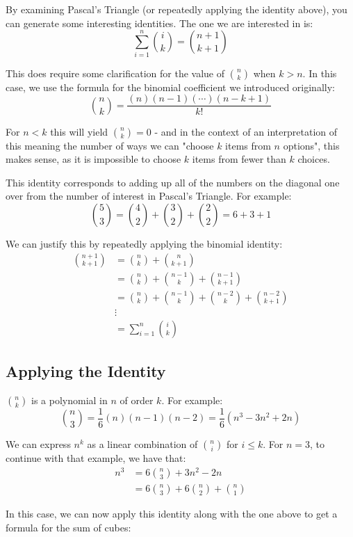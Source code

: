 \documentclass{article}
\begin{document}
By examining Pascal's Triangle (or repeatedly applying the identity above), you can generate
some interesting identities. The one we are interested in is:
\[ \sum_{i=1}^{n} \binom{i}{k} = \binom{n+1}{k+1} \]

This does require some clarification for the value of $\binom{n}{k}$ when $k>n$. In this case, we use the formula for the binomial coefficient we introduced originally:
\[ \binom{n}{k} = \frac{(n)(n-1)(\cdots)(n-k+1)}{k!} \]

For $n<k$ this will yield $\binom{n}{k} = 0$ - and in the context of an interpretation of
this meaning the number of ways we can "choose $k$ items from $n$ options", this makes sense, as it is impossible to choose $k$ items from fewer than $k$ choices.

This identity corresponds to adding up all of the numbers on the diagonal one over from the
number of interest in Pascal's Triangle. For example:
\[ \binom{5}{3} = \binom{4}{2} + \binom{3}{2} + \binom{2}{2} = 6 + 3 + 1 \]

We can justify this by repeatedly applying the binomial identity:
\begin{align*}
	\binom{n+1}{k+1} &= \binom{n}{k} + \binom{n}{k+1} \\
	&= \binom{n}{k} + \binom{n-1}{k} + \binom{n-1}{k+1} \\
	&= \binom{n}{k} + \binom{n-1}{k} + \binom{n-2}{k} + \binom{n-2}{k+1} \\
	&\vdots \\
	&= \sum_{i=1}^{n} \binom{i}{k} 
\end{align*}

\subsection{Applying the Identity}

$\binom{n}{k}$ is a polynomial in $n$ of order $k$. For example:
\[ \binom{n}{3} = \frac{1}{6}(n)(n-1)(n-2) = \frac{1}{6}(n^3-3n^2+2n) \]

We can express $n^k$ as a linear combination of $\binom{n}{i}$ for $i\leq k$. For $n=3$,
to continue with that example, we have that:
\begin{align*}
	n^3 &= 6\binom{n}{3} +3n^2-2n \\
	&= 6\binom{n}{3} + 6 \binom{n}{2} +\binom{n}{1}
\end{align*}

In this case, we can now apply this identity along with the one above to get a formula
for the sum of cubes:
\end{document}
